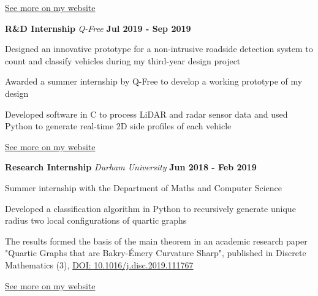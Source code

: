 \documentclass[a4paper, 11pt, hidelinks]{article}
\newcommand{\textsb}[1]{
	\fontseries{sb}\selectfont #1 \normalfont
}
\newcommand{\xp}[3]{
	\vspace{0.5em}
	\textbf{\Large#1} \quad \emph{\large#2} \hfill \textbf{\large#3}
}
\begin{document}
\begin{minipage}{0.587\textwidth}
\begin{itemise}
		\hfill
		\href{https://www.francisgurr.com/pages/masters_project/masters_project.html}{\small See more on my website \faExternalLink}
	\end{itemise}
	\xp{R\&D Internship}{Q-Free}{Jul 2019 - Sep 2019}
	\begin{itemise}
		\item Designed an innovative prototype for a non-intrusive roadside detection system to count and classify vehicles during my third-year design project
		\item Awarded a summer internship by Q-Free to develop a working prototype of my design
		\item Developed software in C to process LiDAR and radar sensor data and used Python to generate real-time 2D side profiles of each vehicle

		\hfill
		\href{https://www.francisgurr.com/pages/qfree_internship/qfree_internship.html}{\small See more on my website \faExternalLink}
	\end{itemise}
	\xp{Research Internship}{Durham University}{Jun 2018 - Feb 2019}
	\begin{itemise}
		\item Summer internship with the Department of Maths and Computer Science
		\item Developed a classification algorithm in Python to recursively generate unique radius two local configurations of quartic graphs
		\item The results formed the basis of the main theorem in an academic research paper "Quartic Graphs that are Bakry-Émery Curvature Sharp", published in Discrete Mathematics \textsb{343}(3), \href{https://doi.org/10.1016/j.disc.2019.111767}{DOI: 10.1016/j.disc.2019.111767 \faExternalLink}

		\hfill
		\href{https://www.francisgurr.com/pages/summer_project/summer_project.html}{\small See more on my website \faExternalLink}
	\end{itemise}
\end{minipage}
\end{document}

